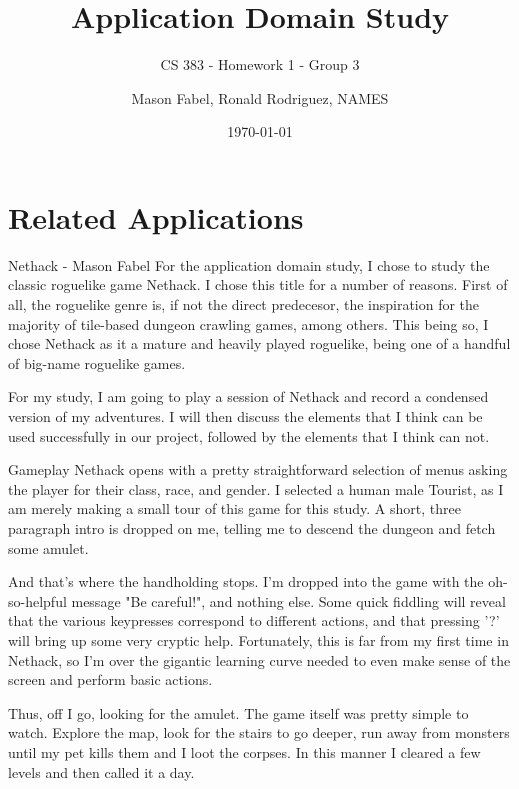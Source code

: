 \documentclass[12pt]{report}
\title{Application Domain Study}
\subtitle{CS 383 - Homework 1 - Group 3}
\author{Mason Fabel, Ronald Rodriguez, NAMES} %
\date{\today}
\begin{document}
\maketitle

\chapter{Related Applications}


\begin{section}{Nethack - Mason Fabel}
For the application domain study, I chose to study the classic roguelike
game Nethack. I chose this title for a number of reasons. First of all,
the roguelike genre is, if not the direct predecesor, the inspiration for
the majority of tile-based dungeon crawling games, among others. This being
so, I chose Nethack as it a mature and heavily played roguelike, being one
of a handful of big-name roguelike games.

For my study, I am going to play a session of Nethack and record a
condensed version of my adventures. I will then discuss the elements that
I think can be used successfully in our project, followed by the elements
that I think can not.

\begin{subsection}{Gameplay}
Nethack opens with a pretty straightforward selection of menus asking the
player for their class, race, and gender. I selected a human male Tourist,
as I am merely making a small tour of this game for this study. A short,
three paragraph intro is dropped on me, telling me to descend the
dungeon and fetch some amulet.

And that's where the handholding stops. I'm dropped into the game with the
oh-so-helpful message "Be careful!", and nothing else. Some quick fiddling
will reveal that the various keypresses correspond to different actions,
and that pressing '?' will bring up some very cryptic help. Fortunately,
this is far from my first time in Nethack, so I'm over the gigantic
learning curve needed to even make sense of the screen and perform basic
actions.

Thus, off I go, looking for the amulet. The game itself was pretty simple
to watch. Explore the map, look for the stairs to go deeper, run away from
monsters until my pet kills them and I loot the corpses. In this manner I
cleared a few levels and then called it a day.
\end{subsection}


\end{section}
\end{document}
